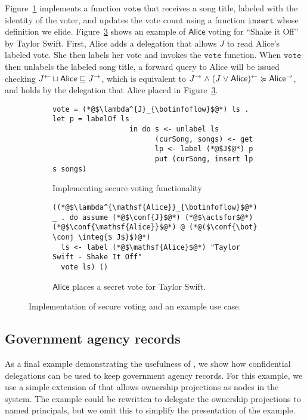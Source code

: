 Figure~\ref{fig:vote-for-song} implements a function $\mathtt{vote}$ that receives a song title, labeled with the identity of the voter, and updates the vote count using a function $\mathtt{insert}$ whose definition we elide. Figure~\ref{fig:jukebox-alice-votes-for-taylor-swift} shows an example of $\mathsf{Alice}$ voting for ``Shake it Off'' by Taylor Swift. First, Alice adds a delegation that allows $J$ to read Alice's labeled vote. She then labels her vote and invokes the $\mathtt{vote}$ function. When $\mathtt{vote}$ then unlabels the labeled song title, a forward query to Alice will be issued checking $J^{\leftarrow} \sqcup \mathsf{Alice} \sqsubseteq J^{\rightarrow}$, which is equivalent to $J^{\rightarrow} \mathrel{\land} (J \mathrel{\lor} \mathsf{Alice})^{\leftarrow} \succcurlyeq \mathsf{Alice}^{\rightarrow}$, and holds by the delegation that Alice placed in Figure~\ref{fig:jukebox-alice-votes-for-taylor-swift}.

\begin{figure}
\centering
\begin{subfigure}{0.5\textwidth}
\begin{lstlisting}
vote = (*@$\lambda^{J}_{\botinfoflow}$@*) ls . let p = labelOf ls
                  in do s <- unlabel ls
                        (curSong, songs) <- get
                        lp <- label (*@$J$@*) p
                        put (curSong, insert lp s songs)
\end{lstlisting}
\caption{Implementing secure voting functionality}
\label{fig:vote-for-song}
\end{subfigure}
\begin{subfigure}{0.5\textwidth}
\begin{lstlisting}
((*@$\lambda^{\mathsf{Alice}}_{\botinfoflow}$@*) _ . do assume (*@$\conf{J}$@*) (*@$\actsfor$@*) (*@$\conf{\mathsf{Alice}}$@*) @ (*@($\conf{\bot} \conj \integ{$ J$}$)@*)
  ls <- label (*@$\mathsf{Alice}$@*) "Taylor Swift - Shake It Off"
  vote ls) ()
\end{lstlisting}
\caption{$\mathsf{Alice}$ places a secret vote for Taylor Swift.}
\label{fig:jukebox-alice-votes-for-taylor-swift}
\end{subfigure}
\caption{Implementation of secure voting and an example use case.}
\end{figure}

\subsection{Government agency records}\label{subsec:agents}
As a final example demonstrating the usefulness of \lang, we show how confidential delegations can be used to keep government agency records. For this example, we use a simple extension of \lang{} that allows ownership projections as nodes in the system. The example could be rewritten to delegate the ownership projections to named principals, but we omit this to simplify the presentation of the example.

